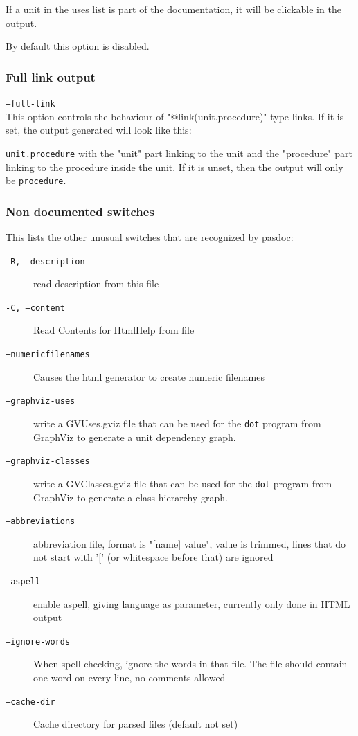 \documentclass[11pt]{article}
\begin{document}
If a unit in the uses list is part of the documentation, it
will be clickable in the output.

By default this option is disabled.

\subsubsection{Full link output}

{\tt --full-link}\\

This option controls the behaviour of "@link(unit.procedure)" type links.
If it is set, the output generated will look like this:

{\tt unit.procedure} with the "unit" part linking to the unit and the
"procedure" part linking to the procedure inside the unit. If it is unset,
then the output will only be {\tt procedure}.

\subsubsection{Non documented switches}

This lists the other unusual switches that are recognized by
pasdoc:

\begin{description}
\item[{\tt -R, --description}] read description from this file
\item[{\tt -C, --content}] Read Contents for HtmlHelp from file
\item[{\tt --numericfilenames}] Causes the html generator to create numeric filenames
\item[{\tt --graphviz-uses}] write a GVUses.gviz file that can be used for the
{\tt dot} program from GraphViz to generate a unit dependency graph.
\item[{\tt --graphviz-classes}] write a GVClasses.gviz file that can be used for the
{\tt dot} program from GraphViz to generate a class hierarchy graph.
\item[{\tt --abbreviations}] abbreviation file, format is "[name]  value", value
is trimmed, lines that do not start with '[' (or whitespace before that) are ignored
\item[{\tt --aspell}] enable aspell, giving language as parameter, currently only done in HTML output
\item[{\tt --ignore-words}] When spell-checking, ignore the words in that file.
The file should contain one word on every line, no comments allowed
\item[{\tt --cache-dir}] Cache directory for parsed files (default not set)
\end{description}
\end{document}
